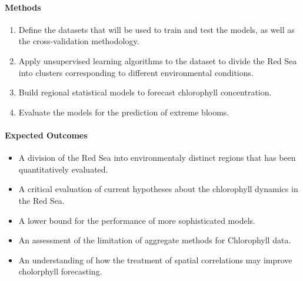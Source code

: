 \begin{samepage}

\paragraph{Methods}

\begin{enumerate}

\item Define the datasets that will be used to train and test the models,
as well as the cross-validation methodology.

\item Apply unsupervised learning algorithms to the dataset to divide
the Red Sea into clusters corresponding to different environmental
conditions.

\item Build regional statistical models to forecast chlorophyll concentration.

\item Evaluate the models for the prediction of extreme blooms.

\end{enumerate}

\end{samepage}

\paragraph{Expected Outcomes}

\begin{itemize}

\item A division of the Red Sea into environmentaly distinct regions that has
been quantitatively evaluated.

\item A critical evaluation of current hypotheses about the chlorophyll
dynamics in the Red Sea.

\item A lower bound for the performance of more sophisticated models.

\item An assessment of the limitation of aggregate methods for Chlorophyll
data.

\item An understanding of how the treatment of spatial correlations may improve
cholorphyll forecasting.

\end{itemize}
